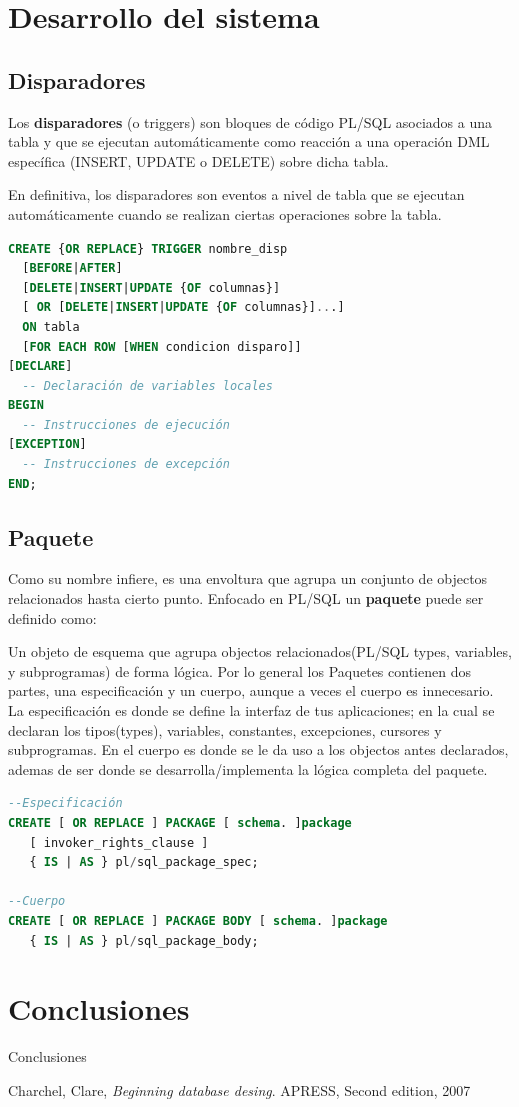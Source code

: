 \documentclass{FR16}
\begin{document}
\section{Desarrollo del sistema}
\subsection{Disparadores}
Los \textbf{disparadores} (o triggers) son bloques de código PL/SQL asociados a una tabla y que se ejecutan automáticamente como reacción a una operación DML específica (INSERT, UPDATE o DELETE) sobre dicha tabla.

En definitiva, los disparadores son eventos a nivel de tabla que se ejecutan automáticamente cuando se realizan ciertas operaciones sobre la tabla.

\begin{lstlisting}[language=Sql]
CREATE {OR REPLACE} TRIGGER nombre_disp
  [BEFORE|AFTER]
  [DELETE|INSERT|UPDATE {OF columnas}] 
  [ OR [DELETE|INSERT|UPDATE {OF columnas}]...]
  ON tabla
  [FOR EACH ROW [WHEN condicion disparo]]
[DECLARE]
  -- Declaración de variables locales
BEGIN
  -- Instrucciones de ejecución
[EXCEPTION]
  -- Instrucciones de excepción
END;
\end{lstlisting}
\subsection{Paquete}

Como su nombre infiere, es una envoltura que agrupa un conjunto de objectos relacionados hasta cierto punto. Enfocado en PL/SQL un \textbf{paquete} puede ser definido como:

Un objeto de esquema que agrupa objectos relacionados(PL/SQL types, variables, y subprogramas) de forma lógica. Por lo general los Paquetes contienen dos partes, una especificación y un cuerpo, aunque a veces el cuerpo es innecesario. La especificación es donde se define la interfaz de tus aplicaciones; en la cual se declaran los tipos(types), variables, constantes, excepciones, cursores y subprogramas. En el cuerpo es donde se le da uso a los objectos antes declarados, ademas de ser donde se desarrolla/implementa la lógica completa del paquete.

\begin{lstlisting}[language=Sql]
--Especificación
CREATE [ OR REPLACE ] PACKAGE [ schema. ]package
   [ invoker_rights_clause ]
   { IS | AS } pl/sql_package_spec;

--Cuerpo
CREATE [ OR REPLACE ] PACKAGE BODY [ schema. ]package
   { IS | AS } pl/sql_package_body;
\end{lstlisting}
\newpage

\section{Conclusiones}
\begin{center}
Conclusiones
\end{center}

\newpage
\begin{thebibliography}{9}
Charchel, Clare, \emph{Beginning database desing}. APRESS, Second edition, 2007
\end{thebibliography}
\end{document}
